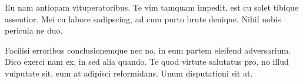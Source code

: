 \documentclass[12pt,a4paper]{report}
\begin{document}
    Eu nam antiopam vituperatoribus. Te vim tamquam impedit, est cu solet tibique assentior. Mei cu labore sadipscing, ad cum purto brute denique. Nihil nobis pericula ne duo.
    
    Facilisi erroribus conclusionemque nec no, in eum partem eleifend adversarium. Dico exerci nam ex, in sed alia quando. Te quod virtute salutatus pro, no illud vulputate sit, eum at adipisci reformidans. Unum disputationi sit at.
    
\end{document}
